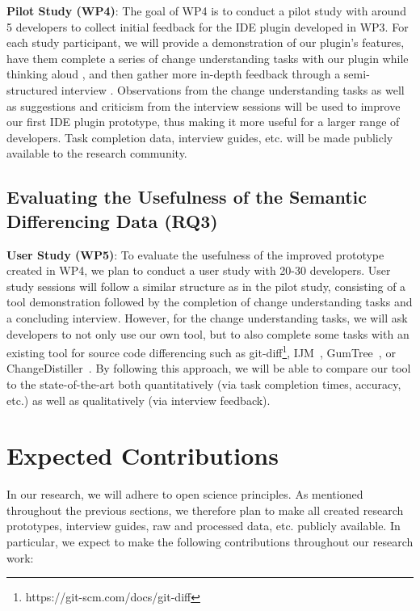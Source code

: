 \textbf{Pilot Study (WP4)}: 
%
The goal of WP4 is to conduct a pilot study with around 5 developers to collect initial feedback for the IDE plugin developed in WP3.
%
For each study participant, we will provide a demonstration of our plugin's features, have them complete a series of change understanding tasks with our plugin while thinking aloud \cite{someren_1994_think_aloud}, and then gather more in-depth feedback through a semi-structured interview \cite{adams_2015_conducting}.
%
Observations from the change understanding tasks as well as suggestions and criticism from the interview sessions will be used to improve our first IDE plugin prototype, thus making it more useful for a larger range of developers. Task completion data, interview guides, etc. will be made publicly available to the research community.
    
\subsection{Evaluating the Usefulness of the Semantic Differencing Data (RQ3)}

\textbf{User Study (WP5)}: 
%
To evaluate the usefulness of the improved prototype created in WP4, we plan to conduct a user study with 20-30 developers.
%
User study sessions will follow a similar structure as in the pilot study, consisting of a tool demonstration followed by the completion of change understanding tasks and a concluding interview.
%
However, for the change understanding tasks, we will ask developers to not only use our own tool, but to also complete some tasks with an existing tool for source code differencing such as git-diff\footnote{https://git-scm.com/docs/git-diff}, IJM~\cite{frick_2018_ijm}, GumTree~\cite{falleri_2014_gumtree}, or ChangeDistiller~\cite{gall_2009_changedistiller}.
%
By following this approach, we will be able to compare our tool to the state-of-the-art both quantitatively (via task completion times, accuracy, etc.) as well as qualitatively (via interview feedback).

\section{Expected Contributions}

In our research, we will adhere to open science principles. As mentioned throughout the previous sections, we therefore plan to make all created research prototypes, interview guides, raw and processed data, etc. publicly available. In particular, we expect to make the following contributions throughout our research work:
    
